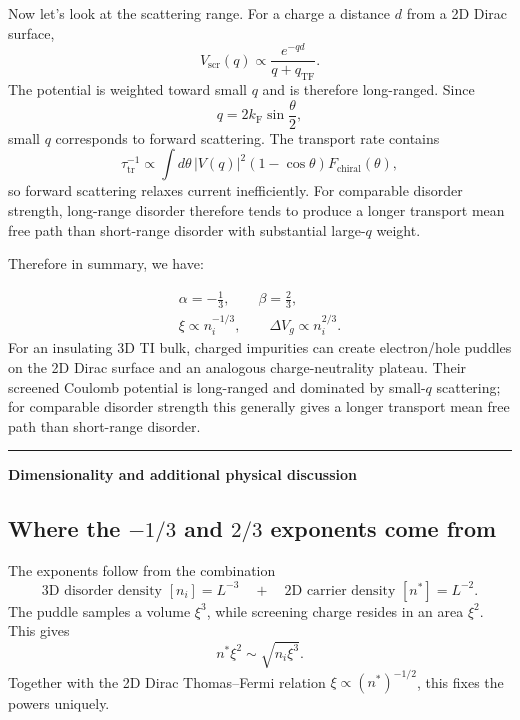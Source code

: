 \documentclass[11pt]{article}
\newcommand{\kF}{k_{\mathrm F}}
\newcommand{\qTF}{q_{\mathrm{TF}}}
\begin{document}
Now let's look at the scattering range. For a charge a distance $d$ from a 2D Dirac surface,
\begin{equation}
    V_{\mathrm{scr}}(q)
    \propto
    \frac{e^{-qd}}{q+\qTF}.
\end{equation}
The potential is weighted toward small $q$ and is therefore long-ranged. Since
\begin{equation}
    q=2\kF\sin\frac{\theta}{2},
\end{equation}
small $q$ corresponds to forward scattering. The transport rate contains
\begin{equation}
    \tau_{\mathrm{tr}}^{-1}
    \propto
    \int d\theta\,|V(q)|^2(1-\cos\theta)
    F_{\mathrm{chiral}}(\theta),
\end{equation}
so forward scattering relaxes current inefficiently. For comparable disorder strength, long-range disorder therefore tends to produce a longer transport mean free path than short-range disorder with substantial large-$q$ weight.

Therefore in summary, we have:

\begin{equation}
\boxed{
\begin{gathered}
\alpha=-\frac13,\qquad \beta=\frac23,\\[2pt]
\xi\propto n_i^{-1/3},\qquad
\Delta V_g\propto n_i^{2/3}.
\end{gathered}}
\end{equation}
For an insulating 3D TI bulk, charged impurities can create electron/hole puddles on the 2D Dirac surface and an analogous charge-neutrality plateau. Their screened Coulomb potential is long-ranged and dominated by small-$q$ scattering; for comparable disorder strength this generally gives a longer transport mean free path than short-range disorder.

\vspace{1em}
\hrule
\vspace{0.8em}

\newpage
\textbf{Dimensionality and additional physical discussion}

\subsection*{Where the $-1/3$ and $2/3$ exponents come from}

The exponents follow from the combination
\begin{equation}
    \boxed{
    \text{3D disorder density }[n_i]=L^{-3}
    \quad + \quad
    \text{2D carrier density }[n^*]=L^{-2}.
    }
\end{equation}
The puddle samples a volume $\xi^3$, while screening charge resides in an area $\xi^2$. This gives
\begin{equation}
    n^*\xi^2\sim\sqrt{n_i\xi^3}.
\end{equation}
Together with the 2D Dirac Thomas--Fermi relation $\xi\propto(n^*)^{-1/2}$, this fixes the powers uniquely.
\end{document}
